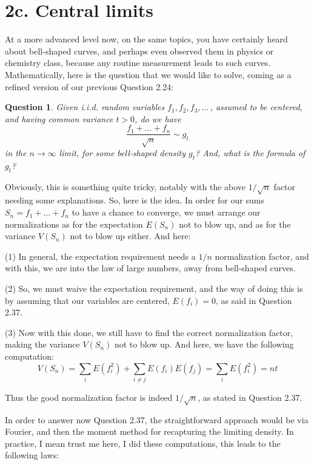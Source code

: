 \documentclass[12pt]{amsbook}
\newtheorem{question}[theorem]{Question}
\begin{document}
\section*{2c. Central limits}

At a more advanced level now, on the same topics, you have certainly heard about bell-shaped curves, and perhaps even observed them in physics or chemistry class, because any routine measurement leads to such curves. Mathematically, here is the question that we would like to solve, coming as a refined version of our previous Question 2.24:


\begin{question}
Given i.i.d. random variables $f_1,f_2,f_3,\ldots\,$, assumed to be centered, and having common variance $t>0$, do we have
$$\frac{f_1+\ldots+f_n}{\sqrt{n}}\sim g_t$$
in the $n\to\infty$ limit, for some bell-shaped density $g_t$? And, what is the formula of $g_t$? 
\end{question}

Obviously, this is something quite tricky, notably with the above $1/\sqrt{n}$ factor needing some explanations. So, here is the idea. In order for our sums $S_n=f_1+\ldots+f_n$ to have a chance to converge, we must arrange our normalizations as for the expectation $E(S_n)$ not to blow up, and as for the variance $V(S_n)$ not to blow up either. And here:

\bigskip

(1) In general, the expectation requirement needs a $1/n$ normalization factor, and with this, we are into the law of large numbers, away from bell-shaped curves.

\bigskip

(2) So, we must waive the expectation requirement, and the way of doing this is by assuming that our variables are centered, $E(f_i)=0$, as said in Question 2.37. 

\bigskip

(3) Now with this done, we still have to find the correct normalization factor, making the variance $V(S_n)$ not to blow up. And here, we have the following computation:
$$V(S_n)
=\sum_iE(f_i^2)+\sum_{i\neq j}E(f_i)E(f_j)
=\sum_iE(f_i^2)
=nt$$

Thus the good normalization factor is indeed $1/\sqrt{n}$, as stated in Question 2.37.

\bigskip

In order to answer now Question 2.37, the straightforward approach would be via Fourier, and then the moment method for recapturing the limiting density. In practice, I mean trust me here, I did these computations, this leads to the following laws:
\end{document}
